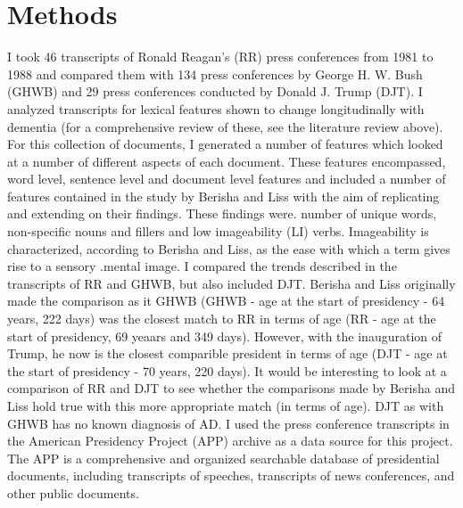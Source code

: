 \documentclass[10pt, letterpaper, twoside, openany]{thesis}
\begin{document}
\section{Methods}
I took 46 transcripts of Ronald Reagan’s (RR) press conferences from 1981 to 1988 and compared them with 134 press conferences by George H. W. Bush (GHWB) and 29 press conferences conducted by Donald J. Trump (DJT).  I analyzed transcripts for lexical features shown to change longitudinally with dementia  (for a comprehensive review of these, see the literature review above). For this collection of documents, I generated a number of features which looked at a number of different aspects of each document. These features encompassed, word level, sentence level and document level features and included a number of features contained in the study by Berisha and Liss with the aim of replicating and extending on their findings. These findings were. number of unique words, non-specific nouns and fillers and low imageability (LI) verbs. Imageability is characterized, according to Berisha and Liss, as the ease with which a term gives rise to a sensory .mental image. I compared the trends described in the transcripts of RR and GHWB, but also included DJT. Berisha and Liss originally made the comparison as it GHWB (GHWB - age at the start of presidency - 64 years, 222 days) was the closest match to RR in terms of age (RR  - age at the start of presidency, 69 yeaars and 349 days). However, with the inauguration of Trump, he now is the closest comparible president in terms of age (DJT - age at the start of presidency - 70 years, 220 days). It would be interesting to look at a comparison of RR and DJT to see whether the comparisons made by Berisha and Liss hold true with this more appropriate match (in terms of age). DJT as with GHWB has no known diagnosis of AD. I used the press conference transcripts in the American Presidency Project (APP) archive as a data source for this project. The APP is a comprehensive and organized searchable database of presidential documents, including transcripts of speeches, transcripts of news conferences, and other public documents.
\end{document}
